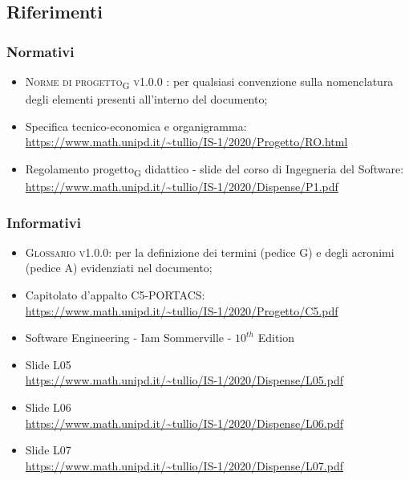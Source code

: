 \subsection{Riferimenti}



\subsubsection{Normativi}

\begin{itemize}
	\item \textsc{Norme di \gls{progetto}\textsubscript{G} v1.0.0 }: per qualsiasi convenzione sulla nomenclatura degli elementi presenti all’interno del documento;
	\item Specifica tecnico-economica e organigramma: \\ {\url{https://www.math.unipd.it/~tullio/IS-1/2020/Progetto/RO.html}} %
	\item Regolamento \gls{progetto}\textsubscript{G} didattico - slide del corso di Ingegneria del Software: \\ {\url{https://www.math.unipd.it/~tullio/IS-1/2020/Dispense/P1.pdf}}
\end{itemize}



\subsubsection{Informativi}
\begin{itemize}
	\item \textsc{Glossario v1.0.0}: per la definizione dei termini (pedice G) e degli acronimi (pedice A) evidenziati nel documento;
	\item Capitolato d'appalto C5-PORTACS: \\
{\url{https://www.math.unipd.it/~tullio/IS-1/2020/Progetto/C5.pdf}}
	\item Software Engineering - Iam Sommerville - $10^{th}$ Edition
	\item Slide L05 \\
	{\url{https://www.math.unipd.it/~tullio/IS-1/2020/Dispense/L05.pdf}}%
	\item Slide L06 \\
	{\url{https://www.math.unipd.it/~tullio/IS-1/2020/Dispense/L06.pdf}}%
	\item Slide L07 \\
	{\url{https://www.math.unipd.it/~tullio/IS-1/2020/Dispense/L07.pdf}}%
\end{itemize}